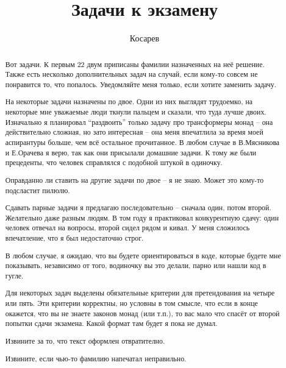 \documentclass[a4paper,14pt]{article}
\title{Задачи к экзамену}
\author{Косарев}
\begin{document}
\begin{abstract}
Вот задачи. К первым 22 двум приписаны фамилии назначенных на неё решение. Также есть несколько дополнительных задач на случай, если кому-то совсем не понравится то, что попалось. Уведомляйте меня только, если хотите заменить задачу.

На некоторые задачи назначены по двое. Одни из них выглядят трудоемко, на некоторые мне уважаемые люди ткнули пальцем и сказали, что туда лучше двоих. Изначально я планировал ``раздвоить'' только задачу про трансформеры монад -- она действительно сложная, но зато интересная -- она меня впечатлила за время моей аспирантуры больше, чем всё остальное прочитанное. В любом случае в В.Мясникова и Е.Орачева я верю, так как они присылали домашние задачи. К тому же были прецеденты, что человек справлялся с подобной штукой в одиночку.

Оправданно ли ставить на другие задачи по двое -- я не знаю. Может это кому-то подсластит пилюлю.

Сдавать парные задачи я предлагаю последовательно -- сначала один, потом второй. Желательно даже разным людям. В том году я практиковал конкурентную сдачу: один человек отвечал на вопросы, второй сидел рядом и кивал. У меня сложилось впечатление, что я был недостаточно строг.

В любом случае, я ожидаю, что вы будете ориентироваться в коде, которые будете мне показывать, независимо от того, водиночку вы это делали, парно или нашли код в гугле.

Для некоторых задач выделены обязательные критерии для претендования на четыре или пять. Эти критерии корректны, но условны в том смысле, что если в конце окажется, что вы не знаете законов монад (или т.п.), то вас мало что спасёт от второй попытки сдачи экзамена. Какой формат там будет я пока не думал.

Извините за то, что текст оформлен отвратително.

Извините, если чью-то фамилию напечатал неправильно.
\end{abstract}

\maketitle
\setcounter{tocdepth}{1}
\tableofcontents

\end{document}

